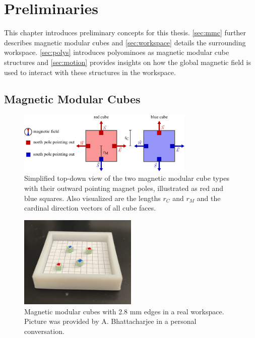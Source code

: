 \chapter{Preliminaries}
\label{chap:prelim}

This chapter introduces preliminary concepts for this thesis.
\autoref{sec:mmc} further describes magnetic modular cubes and \autoref{sec:workspace} details the surrounding workspace.
\autoref{sec:polys} introduces polyominoes as magnetic modular cube structures and \autoref{sec:motion} provides insights on how the global magnetic field is used to interact with these structures in the workspace.

\section{Magnetic Modular Cubes}
\label{sec:mmc}

\begin{figure}
	\centering
	\includegraphics[width=0.75\textwidth]{figures/magnetic_cubes.pdf}
	\caption[Top-down view of magnetic modular cubes]{Simplified top-down view of the two magnetic modular cube types with their outward pointing magnet poles, illustrated as red and blue squares. Also visualized are the lengths $r_C$ and $r_M$ and the cardinal direction vectors of all cube faces.}
	\label{fig:magnetic_cubes}
\end{figure}

\begin{figure}
	\centering
	\includegraphics[width=0.5\textwidth]{figures/real_mmcs2.png}
	\caption[Picture of magnetic modular cubes in a real workspace]{Magnetic modular cubes with 2.8 mm edges in a real workspace. Picture was provided by A. Bhattacharjee in a personal conversation.}
	\label{fig:real_mmcs}
\end{figure}


